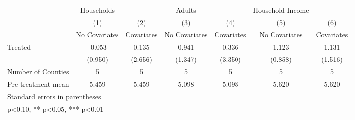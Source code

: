 {
\def\sym#1{\ifmmode^{#1}\else\(^{#1}\)\fi}
\begin{tabular}{l*{6}{c}}
\hline\hline
            &  Households   &               &      Adults   &               &Household Income   &               \\
            &\multicolumn{1}{c}{(1)}&\multicolumn{1}{c}{(2)}&\multicolumn{1}{c}{(3)}&\multicolumn{1}{c}{(4)}&\multicolumn{1}{c}{(5)}&\multicolumn{1}{c}{(6)}\\
            &\multicolumn{1}{c}{No Covariates}&\multicolumn{1}{c}{Covariates}&\multicolumn{1}{c}{No Covariates}&\multicolumn{1}{c}{Covariates}&\multicolumn{1}{c}{No Covariates}&\multicolumn{1}{c}{Covariates}\\
\hline
Treated     &      -0.053   &       0.135   &       0.941   &       0.336   &       1.123   &       1.131   \\
            &     (0.950)   &     (2.656)   &     (1.347)   &     (3.350)   &     (0.858)   &     (1.516)   \\
\hline
Number of Counties&           5   &           5   &           5   &           5   &           5   &           5   \\
Pre-treatment mean&       5.459   &       5.459   &       5.098   &       5.098   &       5.620   &       5.620   \\
\hline\hline
\multicolumn{7}{l}{\footnotesize Standard errors in parentheses}\\
\multicolumn{7}{l}{\footnotesize * p<0.10, ** p<0.05, *** p<0.01}\\
\end{tabular}
}
